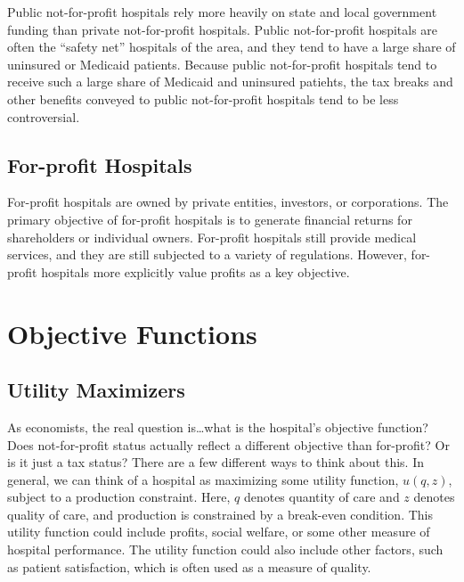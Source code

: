 \documentclass[
  letterpaper,
  DIV=11,
  numbers=noendperiod]{scrreport}
\theoremstyle{definition}
\theoremstyle{remark}
\begin{document}
Public not-for-profit hospitals rely more heavily on state and local
government funding than private not-for-profit hospitals. Public
not-for-profit hospitals are often the ``safety net'' hospitals of the
area, and they tend to have a large share of uninsured or Medicaid
patients. Because public not-for-profit hospitals tend to receive such a
large share of Medicaid and uninsured patiehts, the tax breaks and other
benefits conveyed to public not-for-profit hospitals tend to be less
controversial.

\hypertarget{for-profit-hospitals}{%
\subsection*{For-profit Hospitals}\label{for-profit-hospitals}}

For-profit hospitals are owned by private entities, investors, or
corporations. The primary objective of for-profit hospitals is to
generate financial returns for shareholders or individual owners.
For-profit hospitals still provide medical services, and they are still
subjected to a variety of regulations. However, for-profit hospitals
more explicitly value profits as a key objective.

\hypertarget{objective-functions}{%
\section{Objective Functions}\label{objective-functions}}

\hypertarget{utility-maximizers}{%
\subsection*{Utility Maximizers}\label{utility-maximizers}}

As economists, the real question is\ldots what is the hospital's
objective function? Does not-for-profit status actually reflect a
different objective than for-profit? Or is it just a tax status? There
are a few different ways to think about this. In general, we can think
of a hospital as maximizing some utility function, \(u(q,z)\), subject
to a production constraint. Here, \(q\) denotes quantity of care and
\(z\) denotes quality of care, and production is constrained by a
break-even condition. This utility function could include profits,
social welfare, or some other measure of hospital performance. The
utility function could also include other factors, such as patient
satisfaction, which is often used as a measure of quality.
\end{document}
